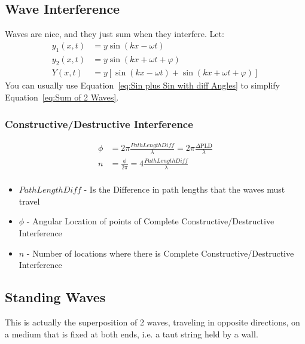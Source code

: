 	\subsection{Wave Interference} \label{subsec:Wave Interference}
	Waves are nice, and they just sum when they interfere. Let: 
	\begin{align}
		y_{1} \left( x, t \right) &= y \sin \left( kx - \omega t \right) \\
		y_{2} \left( x, t \right) &= y \sin \left( kx + \omega t + \varphi \right) \\
		Y \left( x, t \right) &= y\left[ \sin \left( kx - \omega t \right) + \sin \left( kx + \omega t + \varphi \right) \right] \label{eq:Sum of 2 Waves}
	\end{align}
	You can usually use Equation~\ref{eq:Sin plus Sin with diff Angles} to simplify Equation~\ref{eq:Sum of 2 Waves}.

		\subsubsection{Constructive/Destructive Interference} \label{subsubsec:Constructive/Destructive Interference}
		\begin{align*}		
			\phi &= 2 \pi \frac{Path Length Diff}{\lambda} = 2 \pi \frac{\Delta \text{PLD}}{\lambda} \\
			n &= \frac{\phi}{2\pi} = 4 \frac{Path Length Diff}{\lambda}\\
		\end{align*}
		\begin{itemize}[noitemsep]
			\item $Path Length Diff$ - Is the Difference in path lengths that the waves must travel
			\item $\phi$ - Angular Location of points of Complete Constructive/Destructive Interference
			\item $n$ - Number of locations where there is Complete Constructive/Destructive Interference
		\end{itemize}

	\subsection{Standing Waves} \label{subsec:Standing Waves}
	This is actually the superposition of 2 waves, traveling in opposite directions, on a medium that is fixed at both ends, i.e. a taut string held by a wall.
